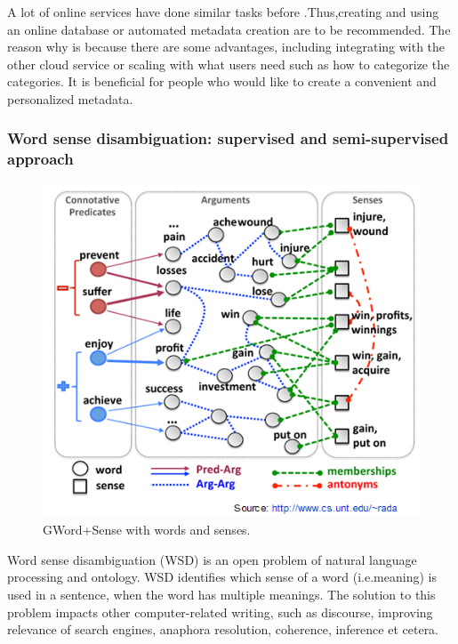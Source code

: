 A lot of online services have done similar tasks before .Thus,creating and using an online database or automated metadata creation are to be recommended. The reason why is because there are some advantages, including integrating with the other cloud service or scaling with what users need such as how to categorize the categories. It is beneficial for people who would like to create a convenient and personalized metadata.    \\

\subsubsection*{Word sense disambiguation: supervised and semi-supervised approach}

\begin{figure}[tbh]
	\begin{center}
		\includegraphics[width=\columnwidth]{union(WSD)}
	\end{center}
	\caption{GWord+Sense with words and senses. \label{fig1}}
\end{figure}

Word sense disambiguation (WSD) is an open problem of natural language processing and ontology. WSD identifies which sense of a word (i.e.meaning) is used in a sentence, when the word has multiple meanings. The solution to this problem impacts other computer-related writing, such as discourse, improving relevance of search engines, anaphora resolution, coherence, inference et cetera.

